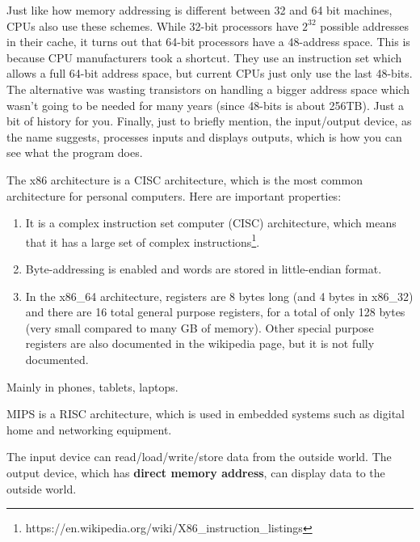 \documentclass{article}
\begin{document}
  Just like how memory addressing is different between 32 and 64 bit machines, CPUs also use these schemes. While 32-bit processors have $2^{32}$ possible addresses in their cache, it turns out that 64-bit processors have a 48-address space. This is because CPU manufacturers took a shortcut. They use an instruction set which allows a full 64-bit address space, but current CPUs just only use the last 48-bits. The alternative was wasting transistors on handling a bigger address space which wasn't going to be needed for many years (since 48-bits is about 256TB). Just a bit of history for you. Finally, just to briefly mention, the input/output device, as the name suggests, processes inputs and displays outputs, which is how you can see what the program does. 

  \begin{example}[x86 Architecture]
    The x86 architecture is a CISC architecture, which is the most common architecture for personal computers. Here are important properties: 
    \begin{enumerate} 
      \item It is a complex instruction set computer (CISC) architecture, which means that it has a large set of complex instructions\footnote{https://en.wikipedia.org/wiki/X86\_instruction\_listings}. 
      \item Byte-addressing is enabled and words are stored in little-endian format.
      \item In the x86\_64 architecture, registers are 8 bytes long (and 4 bytes in x86\_32) and there are 16 total general purpose registers, for a total of only 128 bytes (very small compared to many GB of memory). Other special purpose registers are also documented in the wikipedia page, but it is not fully documented. 
    \end{enumerate}
  \end{example}

  \begin{example}
    Mainly in phones, tablets, laptops. 
  \end{example}

  \begin{example}
    MIPS is a RISC architecture, which is used in embedded systems such as digital home and networking equipment. 
  \end{example}


  \begin{definition}
    The input device can read/load/write/store data from the outside world. The output device, which has \textbf{direct memory address}, can display data to the outside world. 
  \end{definition}
\end{document}

